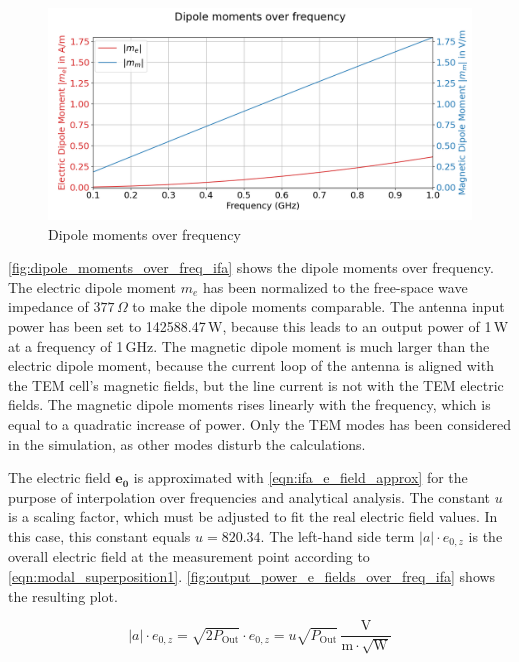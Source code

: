 \begin{figure}[h]
    \centering
    \includegraphics[width=1\linewidth]{content/30_simulations/img/dipole_moments_over_freq_ifa.png}
    \caption{Dipole moments over frequency}
    \label{fig:dipole_moments_over_freq_ifa}
\end{figure}






\autoref{fig:dipole_moments_over_freq_ifa} shows the dipole moments over frequency. The electric dipole moment $m_e$ has been normalized to the free-space wave impedance of $377\,\Omega$ to make the dipole moments comparable. The antenna input power has been set to 142588.47\,W, because this leads to an output power of 1\,W at a frequency of 1\,GHz. The magnetic dipole moment is much larger than the electric dipole moment, because the current loop of the antenna is aligned with the TEM cell's magnetic fields, but the line current is not with the TEM electric fields. The magnetic dipole moments rises linearly with the frequency, which is equal to a quadratic increase of power. Only the TEM modes has been considered in the simulation, as other modes disturb the calculations. 

The electric field $\mathbf{e_0}$ is approximated with \autoref{eqn:ifa_e_field_approx} for the purpose of interpolation over frequencies and analytical analysis. The constant $u$ is a scaling factor, which must be adjusted to fit the real electric field values. In this case, this constant equals $u=820.34$. The left-hand side term $|a|\cdot e_{0,z}$ is the overall electric field at the measurement point according to \autoref{eqn:modal_superposition1}. \autoref{fig:output_power_e_fields_over_freq_ifa} shows the resulting plot. 

\begin{equation}
    |a|\cdot e_{0,z}=\sqrt{2P_\mathrm{Out}}\cdot e_{0,z}=u\sqrt{P_\mathrm{Out}}\,\mathrm{\frac{V}{m\cdot\sqrt{W}}}
    \label{eqn:ifa_e_field_approx}
\end{equation}

